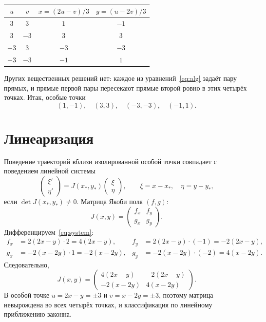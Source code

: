 \documentclass[12pt,a4paper]{article}
\begin{document}
\begin{center}
\begin{tabular}{cccc}
\toprule
\(u\) & \(v\) & \(x = (2u-v)/3\) & \(y = (u-2v)/3\) \\
\midrule
\(3\)  & \(3\)  & \(1\)  & \(-1\) \\
\(3\)  & \(-3\) & \(3\)  & \(3\) \\
\(-3\) & \(3\)  & \(-3\) & \(-3\) \\
\(-3\) & \(-3\) & \(-1\) & \(1\) \\
\bottomrule
\end{tabular}
\end{center}

Других вещественных решений нет: каждое из уравнений~\eqref{eq:alg} задаёт пару прямых, и прямые первой пары пересекают прямые второй ровно в этих четырёх точках. Итак, особые точки
\begin{equation}
\label{eq:points}
(1,-1),\quad (3,3),\quad (-3,-3),\quad (-1,1).
\end{equation}

\section{Линеаризация}

Поведение траекторий вблизи изолированной особой точки совпадает с поведением линейной системы
\[
\begin{pmatrix} \xi' \\ \eta' \end{pmatrix}
=
J(x_*, y_*)
\begin{pmatrix} \xi \\ \eta \end{pmatrix},
\qquad
\xi = x - x_*,\quad \eta = y - y_*,
\]
если \(\det J(x_*, y_*) \neq 0\). Матрица Якоби поля \((f,g)\):
\[
J(x,y) =
\begin{pmatrix}
f_x & f_y \\
g_x & g_y
\end{pmatrix}.
\]
Дифференцируем~\eqref{eq:system}:
\begin{align*}
f_x &= 2(2x-y)\cdot 2 = 4(2x-y), &
f_y &= 2(2x-y)\cdot(-1) = -2(2x-y),\\
g_x &= -2(x-2y)\cdot 1 = -2(x-2y), &
g_y &= -2(x-2y)\cdot(-2) = 4(x-2y).
\end{align*}
Следовательно,
\begin{equation}
\label{eq:J}
J(x,y) =
\begin{pmatrix}
4(2x-y) & -2(2x-y) \\
-2(x-2y) & 4(x-2y)
\end{pmatrix}.
\end{equation}
В особой точке \(u = 2x-y = \pm 3\) и \(v = x-2y = \pm 3\), поэтому матрица невырождена во всех четырёх точках, и классификация по линейному приближению законна.
\end{document}
